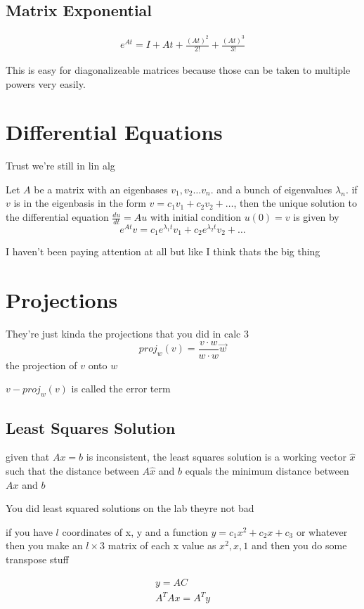 \documentclass[fleqn]{report}
\newcommand{\equations} [1] {
\begin{gather*}
#1
\end{gather*}
}
\begin{document}
\section{Matrix Exponential}
\equations{
    e^{At} = I + At + \frac{(At)^2}{2!} + \frac{(At)^3}{3!}
}

This is easy for diagonalizeable matrices because those can be 
taken to multiple powers very easily. 

\chapter{Differential Equations}
Trust we're still in lin alg 

Let $A$ be a matrix with an eigenbases $v_1, v_2 \ldots v_n$. and a bunch of eigenvalues $\lambda_n$. if $v$ is in the eigenbasis in the form $v = c_1 v_1 + c_2 v_2 + \ldots$, then the unique solution to the differential equation 
$\frac{du}{dt} = Au$ with initial condition $u(0) = v$ is given by 
\[
e^{At} v = 
c_1 e^{\lambda_1 t} v_1 + 
c_2 e^{\lambda_2 t} v_2 + 
\ldots 
\]

I haven't been paying attention at all but like I think thats the 
big thing 

\chapter{Projections}
They're just kinda the projections that you did in calc 3
\[
proj_w(v) = \frac{v \cdot w}{w \cdot w} \vec w
\]
the projection of $v$ onto $w$

$v - proj_w(v)$ is called the error term 

\section{Least Squares Solution}
given that $Ax = b$ is inconsistent, the least squares solution is a
working vector $\hat{x}$ such that the distance between $A \hat x$ and $b$ equals the minimum distance between $A x$ and $b$

You did least squared solutions on the lab theyre not bad 

if you have $l$ coordinates of x, y and a function $y = c_1 x^2 + c_2 x + c_3$ or 
whatever then you make an $l \times 3$ matrix of each x value as $x^2, x, 1$ 
and then you do some transpose stuff 

\equations{
    y = A C
    \\
    A^T A x = A^T y
}
\end{document}

